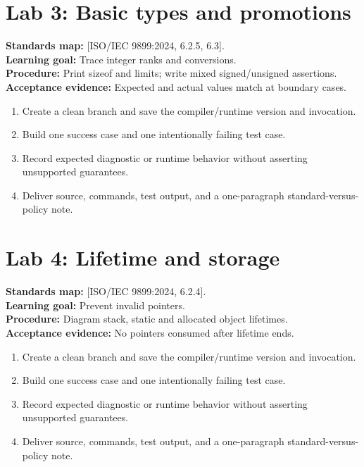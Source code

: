 \documentclass[10pt,letterpaper,oneside]{report}
\newcommand{\refcl}[1]{\textsf{\footnotesize[ISO/IEC 9899:2024, #1]}}
\begin{document}
\section{Lab 3: Basic types and promotions}
\textbf{Standards map:} \refcl{6.2.5, 6.3}.\\
\textbf{Learning goal:} Trace integer ranks and conversions.\\
\textbf{Procedure:} Print sizeof and limits; write mixed signed/unsigned assertions.\\
\textbf{Acceptance evidence:} Expected and actual values match at boundary cases.
\begin{enumerate}
\item Create a clean branch and save the compiler/runtime version and invocation.
\item Build one success case and one intentionally failing test case.
\item Record expected diagnostic or runtime behavior without asserting unsupported guarantees.
\item Deliver source, commands, test output, and a one-paragraph standard-versus-policy note.
\end{enumerate}

\section{Lab 4: Lifetime and storage}
\textbf{Standards map:} \refcl{6.2.4}.\\
\textbf{Learning goal:} Prevent invalid pointers.\\
\textbf{Procedure:} Diagram stack, static and allocated object lifetimes.\\
\textbf{Acceptance evidence:} No pointers consumed after lifetime ends.
\begin{enumerate}
\item Create a clean branch and save the compiler/runtime version and invocation.
\item Build one success case and one intentionally failing test case.
\item Record expected diagnostic or runtime behavior without asserting unsupported guarantees.
\item Deliver source, commands, test output, and a one-paragraph standard-versus-policy note.
\end{enumerate}
\end{document}
